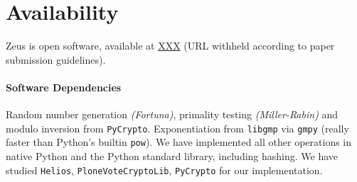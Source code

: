 \documentclass[letterpaper,10pt]{article}
\begin{document}
\section{Availability}

Zeus is open software, available at \url{XXX} (URL withheld according
to paper submission guidelines).

\paragraph{Software Dependencies}
Random number generation \emph{(Fortuna)}, primality testing
\emph{(Miller-Rabin)} and modulo inversion from \texttt{PyCrypto}.
Exponentiation from \texttt{libgmp} via \texttt{gmpy} (really faster
than Python's builtin \texttt{pow}). We have implemented all other
operations in native Python and the Python standard library, including
hashing. We have studied \texttt{Helios}, \texttt{PloneVoteCryptoLib},
\texttt{PyCrypto} for our implementation.

{\footnotesize


}
\end{document}

